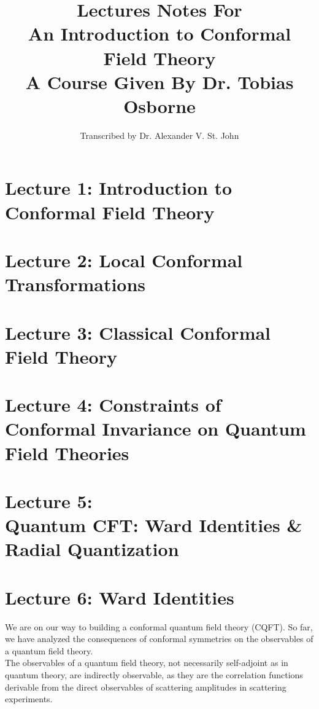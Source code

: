 \documentclass[10pt]{article}
\title{Lectures Notes For \\ An Introduction to Conformal Field Theory \\ A Course Given By Dr. Tobias Osborne}
\author{Transcribed by Dr. Alexander V. St. John}
\begin{document}
\maketitle

\clearpage

\section*{Lecture 1: Introduction to Conformal Field Theory}
\label{sec: lec1}



\clearpage

\section*{Lecture 2: Local Conformal Transformations}
\label{sec: lec2}



\clearpage

\section*{Lecture 3: Classical Conformal Field Theory}
\label{sec: lec3}



\clearpage

\section*{Lecture 4: Constraints of Conformal Invariance on Quantum Field Theories}
\label{sec: lec4}



\clearpage

\section*{Lecture 5: \\ Quantum CFT: Ward Identities \& Radial Quantization}
\label{sec: lec5}



\clearpage

\section*{Lecture 6: Ward Identities}
\label{sec: lec6}

\noindent We are on our way to building a conformal quantum field theory (CQFT). So far, we have analyzed the consequences of conformal symmetries on the observables of a quantum field theory. \\

\noindent The observables of a quantum field theory, not necessarily self-adjoint as in quantum theory, are indirectly observable, as they are the correlation functions derivable from the direct observables of scattering amplitudes in scattering experiments. \\



%

\end{document}
